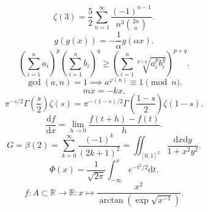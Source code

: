 \documentclass[12pt]{article}
\begin{document}
    \[
    \zeta(3) = \frac{5}{2}\sum_{n=1}^{\infty} \frac{(-1)^{n-1}}{n^3\binom{2n}{n}}
    .\]         
    \[
    g(g(x)) = - \frac{1}{\alpha}g(\alpha x)
    .\] 
    \[
        \left( \sum_{i=1}^{n} a_i \right) ^{p}\left( \sum_{i=1}^{n} b_i \right) ^{q} \geq \left( \sum_{i=1}^{n} \sqrt[p+q]{a_i^{p}b_i^{q}}  \right) ^{p+q} 
    .\] 
    \[
    \gcd(a, n) = 1 \implies a^{\varphi(n)}\equiv 1 \pmod n
    .\] 
    \[
    m\ddot x = - kx
    .\] 
    \[
    \pi^{- s / 2}\Gamma\left( \frac{s}{2} \right) \zeta(s) = \pi^{-(1-s) / 2}\Gamma\left( \frac{1-s}{2} \right) \zeta(1-s)
    .\] 
    \[
    \frac{\mathrm df}{\mathrm dx} = \lim_{h \to 0} \frac{f(t+h)-f(t)}{h}
    .\] 
    \[
    G = \beta(2) = \sum_{k=0}^{\infty} \frac{(-1)^{k}}{(2k+1)^2}= \iint_{[0, 1]^2} \frac{\mathrm{d}x \mathrm{d}y }{1 + x^2y^2}
    .\] 
    \[
    \Phi(x) = \frac{1}{\sqrt{2\pi}   }\int_{-\infty}^{x} e^{-t^2 / 2}\mathrm{d}t
    .\] 
    \[
    f :A \subset    \mathbb R \to \mathbb R: x \mapsto \frac{x^2}{\arctan(\exp\sqrt{x^{-1}} )}
    .\] 
\end{document}
